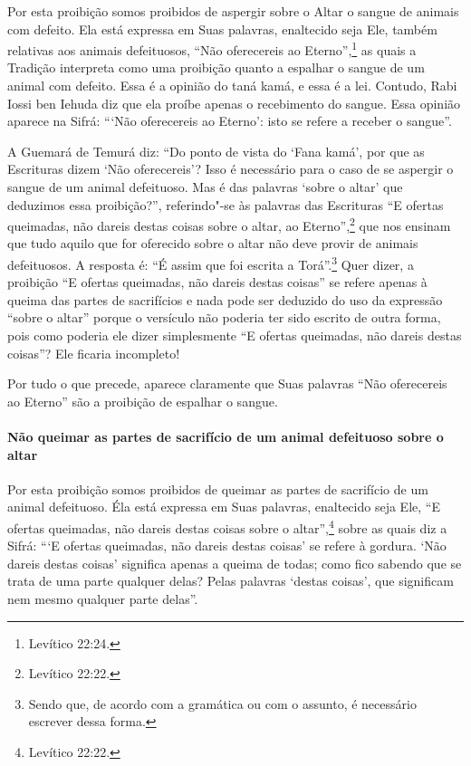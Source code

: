 \begin{multicols}{2}
Por esta proibição somos proibidos de aspergir sobre o Altar o sangue
de animais com defeito. Ela está expressa em Suas palavras, enaltecido
seja Ele, também relativas aos animais defeituosos, ``Não oferecereis ao
Eterno'',\footnote{Levítico 22:24.} as quais a Tradição interpreta como uma
proibição quanto a espalhar o sangue de um animal com defeito. Essa é a
opinião do taná kamá\starr, e essa é a lei. Contudo, Rabi Iossi ben Iehuda\starr{}
diz que ela proíbe apenas o recebimento do sangue. Essa opinião aparece
na Sifrá\starr: ```Não oferecereis ao Eterno': isto se refere a receber o
sangue''.

A Guemará\starr{} de Temurá\starr{} diz: ``Do ponto de vista do `Fana
kamá', por que as Escrituras dizem `Não oferecereis'? Isso é necessário
para o caso de se aspergir o sangue de um animal defeituoso. Mas é das
palavras `sobre o altar' que deduzimos essa proibição?'', referindo"-se
às palavras das Escrituras ``E ofertas queimadas, não dareis destas
coisas sobre o altar, ao Eterno'',\footnote{Levítico 22:22.} que nos ensinam que
tudo aquilo que for oferecido sobre o altar não deve provir de animais
defeituosos. A resposta é: ``É assim que foi escrita a
Torá\starr''.\footnote{Sendo que, de acordo com a gramática ou com o assunto, é necessário
  escrever dessa forma.} Quer dizer, a proibição ``E ofertas
queimadas, não dareis destas coisas'' se refere apenas à queima das
partes de sacrifícios e nada pode ser deduzido do uso da expressão
``sobre o altar'' porque o versículo não poderia ter sido escrito de
outra forma, pois como poderia ele dizer simplesmente ``E ofertas
queimadas, não dareis destas coisas''? Ele ficaria incompleto!

Por tudo o que precede, aparece claramente que Suas palavras ``Não
oferecereis ao Eterno'' são a proibição de espalhar o sangue.

\paragraph{Não queimar as partes de sacrifício de um animal defeituoso sobre o altar}

Por esta proibição somos proibidos de queimar as partes de sacrifício
de um animal defeituoso. Éla está expressa em Suas palavras, enaltecido
seja Ele, ``E ofertas queimadas, não dareis destas coisas sobre o
altar'',\footnote{Levítico 22:22.} sobre as quais diz a Sifrá\starr: ```E ofertas
queimadas, não dareis destas coisas' se refere à gordura. `Não dareis
destas coisas' significa apenas a queima de todas; como fico sabendo que
se trata de uma parte qualquer delas? Pelas palavras `destas coisas',
que significam nem mesmo qualquer parte delas''.


\end{multicols}
